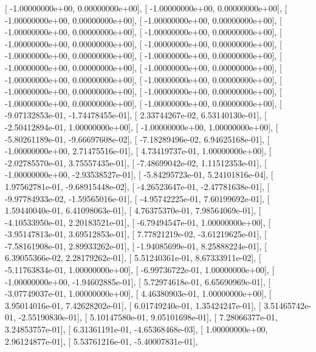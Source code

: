 \documentclass{article}
\begin{document}
       [ -1.00000000e+00,   0.00000000e+00],
       [ -1.00000000e+00,   0.00000000e+00],
       [ -1.00000000e+00,   0.00000000e+00],
       [ -1.00000000e+00,   0.00000000e+00],
       [ -1.00000000e+00,   0.00000000e+00],
       [ -1.00000000e+00,   0.00000000e+00],
       [ -1.00000000e+00,   0.00000000e+00],
       [ -1.00000000e+00,   0.00000000e+00],
       [ -1.00000000e+00,   0.00000000e+00],
       [ -1.00000000e+00,   0.00000000e+00],
       [ -1.00000000e+00,   0.00000000e+00],
       [ -1.00000000e+00,   0.00000000e+00],
       [ -1.00000000e+00,   0.00000000e+00],
       [ -1.00000000e+00,   0.00000000e+00],
       [ -1.00000000e+00,   0.00000000e+00],
       [ -1.00000000e+00,   0.00000000e+00],
       [ -1.00000000e+00,   0.00000000e+00],
       [ -1.00000000e+00,   0.00000000e+00],
       [ -9.07132853e-01,  -1.74478455e-01],
       [  2.33744267e-02,   6.53140130e-01],
       [ -2.50412894e-01,   1.00000000e+00],
       [ -1.00000000e+00,   1.00000000e+00],
       [ -5.80261189e-01,  -9.66697608e-02],
       [ -7.18289496e-02,   6.94625168e-01],
       [ -1.00000000e+00,   2.71475516e-01],
       [  4.73419737e-01,   1.00000000e+00],
       [ -2.02785570e-01,   3.75557435e-01],
       [ -7.48699042e-02,   1.11512353e-01],
       [ -1.00000000e+00,  -2.93538527e-01],
       [ -5.84295723e-01,   5.24101816e-04],
       [  1.97562781e-01,  -9.68915448e-02],
       [ -4.26523647e-01,  -2.47781638e-01],
       [ -9.97784933e-02,  -1.59565016e-01],
       [ -4.95742225e-01,   7.60199692e-01],
       [  1.59440040e-01,   6.41098063e-01],
       [  4.76375370e-01,   7.98564069e-01],
       [ -4.10533950e-01,   2.20183521e-01],
       [ -6.79494547e-01,   1.00000000e+00],
       [ -3.95147813e-01,   3.69512853e-01],
       [  7.77821219e-02,  -3.61219625e-01],
       [ -7.58161908e-01,   2.89933262e-01],
       [ -1.94085699e-01,   8.25888224e-01],
       [  6.39055366e-02,   2.28179262e-01],
       [  5.51240361e-01,   8.67333911e-02],
       [ -5.11763834e-01,   1.00000000e+00],
       [ -6.99736722e-01,   1.00000000e+00],
       [ -1.00000000e+00,  -1.94602885e-01],
       [  5.72974618e-01,   6.65690969e-01],
       [ -3.07749037e-01,   1.00000000e+00],
       [  4.46380903e-01,   1.00000000e+00],
       [  3.95014016e-01,   7.42628202e-01],
       [  6.01749240e-01,   1.35424247e-01],
       [  3.51465742e-01,  -2.55190830e-01],
       [  5.10147580e-01,   9.05101698e-01],
       [  7.28066377e-01,   3.24853757e-01],
       [  6.31361191e-01,  -4.65368468e-03],
       [  1.00000000e+00,   2.96124877e-01],
       [  5.53761216e-01,  -5.40007831e-01],
\end{document}
